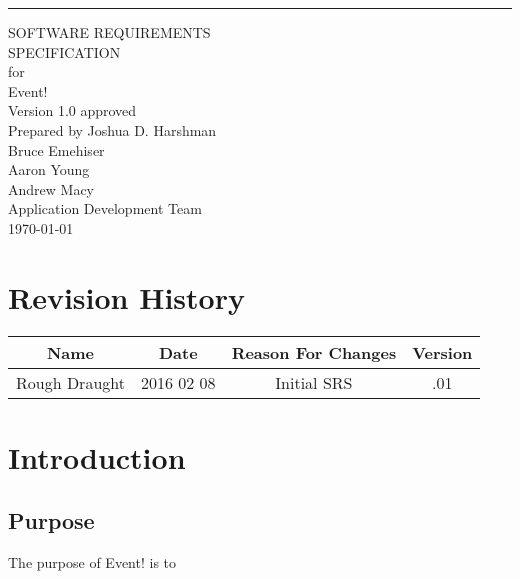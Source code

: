 \documentclass{scrreprt}
\date{}
\def\myversion{1.0 }
\begin{document}
\begin{flushright}
    \rule{16cm}{5pt}\vskip1cm
    \begin{bfseries}
        \Huge{SOFTWARE REQUIREMENTS\\ SPECIFICATION}\\
        \vspace{1.9cm}
        for\\
        \vspace{1.9cm}
        Event!\\
        \vspace{1.9cm}
        \LARGE{Version \myversion approved}\\
        \vspace{1.9cm}
        Prepared by Joshua D. Harshman\\Bruce Emehiser\\Aaron Young\\Andrew Macy\\
        \vspace{1.9cm}
        Application Development Team\\
        \vspace{1.9cm}
        \today\\
    \end{bfseries}
\end{flushright}

\tableofcontents


\chapter*{Revision History}

\begin{center}
    \begin{tabular}{|c|c|c|c|}
        \hline
	    Name & Date & Reason For Changes & Version\\
        \hline
	    Rough Draught & 2016 02 08 & Initial SRS & .01\\
        \hline
    \end{tabular}
\end{center}

\chapter{Introduction}

\section{Purpose}
The purpose of Event! is to 
\end{document}
